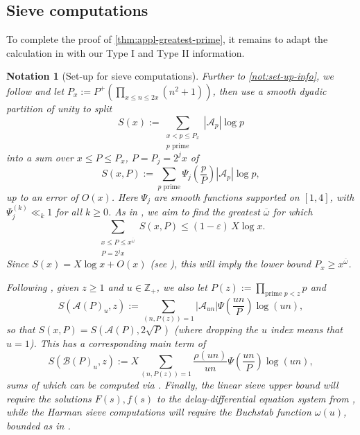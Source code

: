 \documentclass[reqno,11pt]{amsart}
\newtheorem{notation}[theorem]{Notation}
\theoremstyle{remark}
\numberwithin{equation}{section}
\newcommand{\Z}{\mathbb{Z}}
\newcommand{\mA}{\mathcal{A}}
\newcommand{\mB}{\mathcal{B}}
\newcommand{\eps}{\varepsilon}
\renewcommand{\bar}{\overline}
\begin{document}
\subsection{Sieve computations} \label{subsec:harman-sieve}
To complete the proof of \cref{thm:appl-greatest-prime}, it remains to adapt the calculation in \cite[\S 2]{merikoski2023largest} with our Type I and Type II information.

\begin{notation}[Set-up for sieve computations] \label{not:set-up-harman}
Further to \cref{not:set-up-info}, we follow \cite[p.\,1257]{merikoski2023largest} and let $P_x := P^+\left(\prod_{x\le n \le 2x}(n^2+1)\right)$, then use a smooth dyadic partition of unity to split
\[
    S(x) := \sum_{\substack{x < p \le P_x \\ p \text{ prime}}} |\mA_p| \log p
\]
into a sum over $x \le P \le P_x$, $P = P_j = 2^j x$ of
\[
    S(x, P) := \sum_{p \text{ prime}} \Psi_j \left(\frac{p}{P}\right) |\mA_p| \log p,
\]
up to an error of $O(x)$. Here $\Psi_j$ are smooth functions supported on $[1, 4]$, with $\Psi_j^{(k)} \ll_k 1$ for all $k \ge 0$. As in \cite[p.\,1257]{merikoski2023largest}, we aim to find the greatest $\bar{\omega}$ for which 
\begin{equation} \label{eq:harman-final-bound}
    \sum_{\substack{x \le P \le x^{\bar{\omega}} \\ P = 2^j x}} S(x, P) \le (1-\eps)\, X \log x.
\end{equation}
Since $S(x) = X \log x + O(x)$ (see \cite[(2.1)]{merikoski2023largest}), this will imply the lower bound $P_x \ge x^{\bar{\omega}}$.

Following \cite[p.\,1259]{merikoski2023largest}, given $z \ge 1$ and $u \in \Z_+$, we also let $P(z) := \prod_{\text{prime } p < z} p$ and
\[
    S(\mA(P)_u, z) := \sum_{(n, P(z)) = 1} |\mA_{un}| \Psi\left(\frac{un}{P}\right) \log(un),
\]
so that $S(x, P) = S(\mA(P), 2\sqrt{P})$ (where dropping the $u$ index means that $u = 1$). This has a corresponding main term of
\[
    S(\mB(P)_u, z) := X \sum_{(n, P(z)) = 1} \frac{\rho(un)}{un} \Psi\left(\frac{un}{P}\right) \log(un),
\]
sums of which can be computed via \cite[Lemma 1]{merikoski2023largest}. Finally, the linear sieve upper bound will require the solutions $F(s), f(s)$ to the delay-differential equation system from \cite[p.\,1263]{merikoski2023largest}, while the Harman sieve computations will require the Buchstab function $\omega(u)$, bounded as in \cite[(2.5)]{merikoski2023largest}.
\end{notation}
\end{document}

